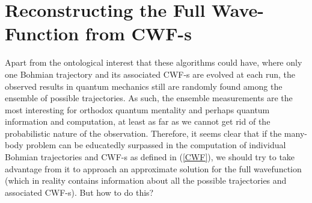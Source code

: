 \documentclass[11pt, a4paper]{article} %
\begin{document}
\newpage
\section{Reconstructing the Full Wave-Function from CWF-s}
Apart from the ontological interest that these algorithms could have, where only one Bohmian trajectory and its associated CWF-s are evolved at each run, the observed results in quantum mechanics still are randomly found among the ensemble of possible trajectories. As such, the ensemble measurements are the most interesting for orthodox quantum mentality and perhaps quantum information and computation, at least as far as we cannot get rid of the probabilistic nature of the observation. Therefore, it seems clear that if the many-body problem can be educatedly surpassed in the computation of individual Bohmian trajectories and CWF-s as defined in (\ref{CWF}), we should try to take advantage from it to approach an approximate solution for the full wavefunction (which in reality contains information about all the possible trajectories and associated CWF-s). But how to do this?
\end{document}
